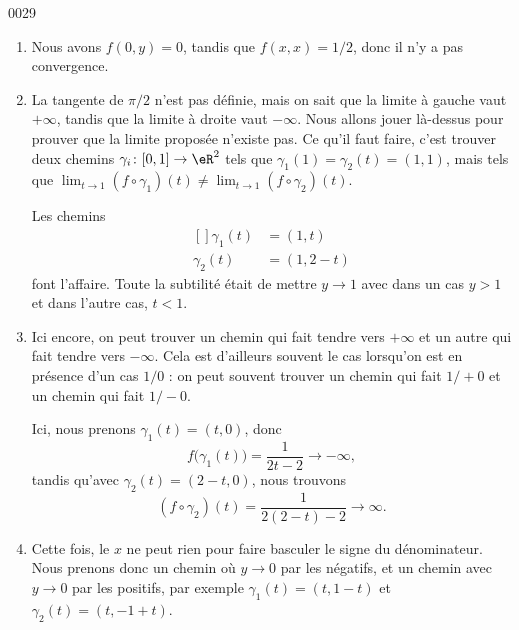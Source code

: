 
\begin{corrige}{0029}

\begin{enumerate}
\item Nous avons $f(0,y)=0$, tandis que $f(x,x)=1/2$, donc il n'y a pas convergence.
\item La tangente de $\pi/2$ n'est pas définie, mais on sait que la limite à gauche vaut $+\infty$, tandis que la limite à droite vaut $-\infty$. Nous allons jouer là-dessus pour prouver que la limite proposée n'existe pas. Ce qu'il faut faire, c'est trouver deux chemins $\gamma_i\colon [0,1]\to \eR^2$ tels que $\gamma_1(1)=\gamma_2(t)=(1,1)$, mais tels que $\lim_{t\to 1}(f\circ \gamma_1)(t)\neq\lim_{t\to 1}(f\circ\gamma_2)(t)$.

Les chemins
\begin{equation}
	\begin{aligned}[]
		\gamma_1(t)	&=(1,t)\\
		\gamma_2(t)	&=(1,2-t)
	\end{aligned}
\end{equation}
font l'affaire. Toute la subtilité était de mettre $y\to 1$ avec dans un cas $y>1$ et dans l'autre cas, $t<1$.

\item Ici encore, on peut trouver un chemin qui fait tendre vers $+\infty$ et un autre qui fait tendre vers $-\infty$. Cela est d'ailleurs souvent le cas lorsqu'on est en présence d'un cas $1/0$ : on peut souvent trouver un chemin qui fait $1/+0$ et un chemin qui fait $1/-0$.

Ici, nous prenons $\gamma_1(t)=(t,0)$, donc
\begin{equation}
	f\big( \gamma_1(t) \big)=\frac{ 1 }{ 2t-2 }\to-\infty,
\end{equation}
tandis qu'avec $\gamma_2(t)=(2-t,0)$, nous trouvons
\begin{equation}
	(f\circ\gamma_2)(t)=\frac{1}{ 2(2-t)-2 }\to\infty.
\end{equation}

\item Cette fois, le $x$ ne peut rien pour faire basculer le signe du dénominateur. Nous prenons donc un chemin où $y\to 0$ par les négatifs, et un chemin avec $y\to 0$ par les positifs, par exemple $\gamma_1(t)=(t,1-t)$ et $\gamma_2(t)=(t,-1+t)$.
\end{enumerate}

\end{corrige}
